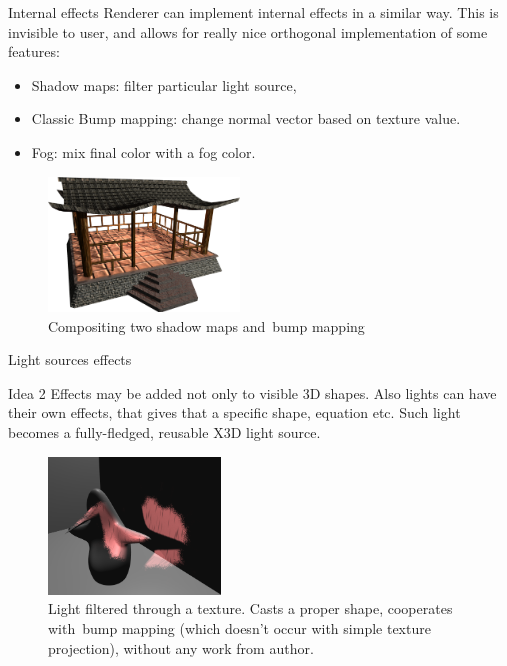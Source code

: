 \documentclass{beamer}
\begin{document}
\begin{frame}{Internal effects}
Renderer can implement internal effects in a similar way.
This is invisible to user, and allows for really nice orthogonal implementation
of some features:

\begin{itemize}
  \item Shadow maps: filter particular light source,
  \item Classic Bump mapping: change normal vector based on texture value.
  \item Fog: mix final color with a fog color.
\end{itemize}

\begin{figure}
  \centering
  \includegraphics[width=2in]{../rhan_shrine_5_everything}
  \caption{Compositing two shadow maps and~bump mapping}
\end{figure}
\end{frame}

\begin{frame}{Light sources effects}
\begin{block}{Idea 2}
Effects may be added not only to visible 3D shapes.
Also lights can have their own effects, that gives that a specific
shape, equation etc. Such light becomes a fully-fledged, reusable X3D
light source.
\end{block}

\begin{figure}
  \centering
  \includegraphics[width=1.8in]{../fancy_light_spot_shape}
  \caption{Light filtered through a texture. Casts a proper shape, cooperates with~bump mapping (which doesn't occur with simple texture projection), without any work from author.}
\end{figure}
\end{frame}
\end{document}
